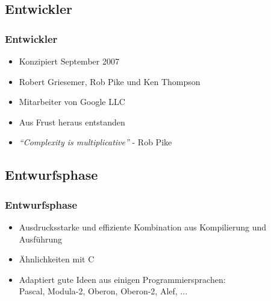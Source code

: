 \documentclass{beamer}
\begin{document}
\subsection{Entwickler}
\begin{frame}
\frametitle{Entwickler}

\begin{itemize}
\setlength{\itemsep}{24pt}
\item Konzipiert September 2007
\item Robert Griesemer, Rob Pike und Ken Thompson
\item Mitarbeiter von Google LLC \textregistered
\item Aus Frust heraus entstanden
\item \textit{``Complexity is multiplicative''} - Rob Pike
\end{itemize}

\end{frame}


\subsection{Entwurfsphase}
\begin{frame}
\frametitle{Entwurfsphase}

\begin{itemize}
\setlength{\itemsep}{20pt}
\item Ausdrucksstarke und effiziente Kombination aus Kompilierung und Ausf\"uhrung
\item Ähnlichkeiten mit C
\item Adaptiert gute Ideen aus einigen Programmiersprachen: \\
Pascal, Modula-2, Oberon, Oberon-2, Alef, ...
\end{itemize}

\end{frame}
\end{document}

